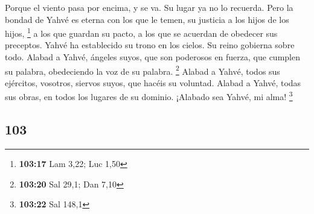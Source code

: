 \begin{paracol}{2}
 Porque el viento pasa por encima, y se va. Su lugar ya
no lo recuerda.  Pero la bondad de Yahvé es eterna con
los que le temen, su justicia a los hijos de los hijos, \footnote{\textbf{103:17}
  Lam 3,22; Luc 1,50}  a los que guardan su pacto, a los
que se acuerdan de obedecer sus preceptos.  Yahvé ha
establecido su trono en los cielos. Su reino gobierna sobre todo.
 Alabad a Yahvé, ángeles suyos, que son poderosos en
fuerza, que cumplen su palabra, obedeciendo la voz de su palabra.
\footnote{\textbf{103:20} Sal 29,1; Dan 7,10}  Alabad a
Yahvé, todos sus ejércitos, vosotros, siervos suyos, que hacéis su
voluntad.  Alabad a Yahvé, todas sus obras, en todos los
lugares de su dominio. ¡Alabado sea Yahvé, mi alma! \footnote{\textbf{103:22}
  Sal 148,1}

\switchcolumn
\begin{otherlanguage}{english}

\hypertarget{section-205}{%
\section{103}\label{section-205}}


\end{otherlanguage}
\end{paracol}
